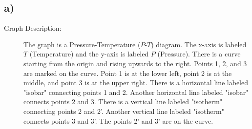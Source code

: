 

\subsection*{a)}

\begin{description}
    \item[Graph Description:] The graph is a Pressure-Temperature ($P$-$T$) diagram. The x-axis is labeled $T$ (Temperature) and the y-axis is labeled $P$ (Pressure). There is a curve starting from the origin and rising upwards to the right. Points 1, 2, and 3 are marked on the curve. Point 1 is at the lower left, point 2 is at the middle, and point 3 is at the upper right. There is a horizontal line labeled "isobar" connecting points 1 and 2. Another horizontal line labeled "isobar" connects points 2 and 3. There is a vertical line labeled "isotherm" connecting points 2 and 2'. Another vertical line labeled "isotherm" connects points 3 and 3'. The points 2' and 3' are on the curve.
\end{description}